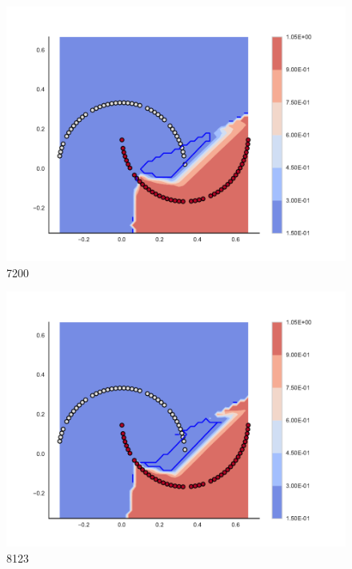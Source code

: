 \begin{subfigure}[b]{0.12\textwidth}
    \includegraphics[clip, trim=2.35cm 1.75cm 4.5cm 0cm,width=\textwidth]{img/convergence/7200.pdf}
    \caption{7200}
    \label{fig:convergence_7200}
\end{subfigure}
%
\begin{subfigure}[b]{0.12\textwidth}
    \includegraphics[clip, trim=2.35cm 1.75cm 4.5cm 0cm,width=\textwidth]{img/convergence/8123.pdf}
    \caption{8123}
    \label{fig:convergence_8123}
\end{subfigure}
%
